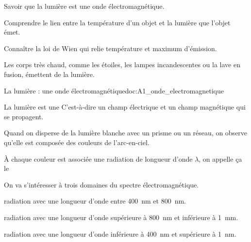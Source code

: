 \tetePremStssLumi



\begin{objectifs}
  \item Savoir que la lumière est une onde électromagnétique.
  \item Comprendre le lien entre la température d'un objet et la lumière que l'objet émet.
  \item Connaître la loi de Wien qui relie température et maximum d'émission.
\end{objectifs}

\begin{contexte}
  Les corps très chaud, comme les étoiles, les lampes incandescentes ou la lave en fusion, émettent de la lumière.
  
\end{contexte}


\begin{doc}{La lumière : une onde électromagnétique}{doc:A1_onde_electromagnetique}
  \begin{encart}
    La lumière est une 
    C'est-à-dire un champ électrique et un champ magnétique qui se propagent.
  \end{encart}

  Quand on disperse de la lumière blanche avec un prisme ou un réseau, on observe qu'elle est composée des couleurs de l'arc-en-ciel.
  \begin{center}
  \end{center}
  \begin{center}
  \end{center}

  À chaque couleur est associée une radiation de longueur d'onde $\lambda$, on appelle ça le 

  \begin{encart}    
    On va s'intéresser à trois domaines du spectre électromagnétique.
    \begin{listePoints}
      \item {} radiation avec une longueur d'onde entre \qty{400}{\nm} et \qty{800}{\nm}.
      \item {} radiation avec une longueur d'onde supérieure à \qty{800}{\nm} et inférieure à \qty{1}{\mm}.
      \item {} radiation avec une longueur d'onde inférieure à \qty{400}{\nm} et supérieure à \qty{1}{\nm}.
    \end{listePoints}
  \end{encart}
\end{doc}

